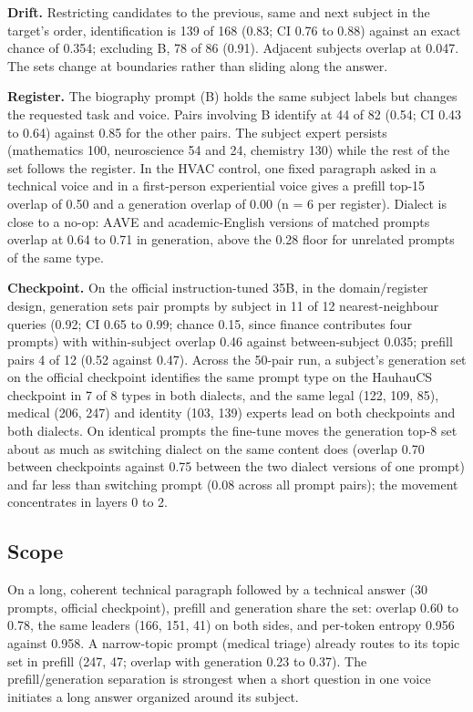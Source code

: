 \documentclass[10pt,twocolumn]{article}
\begin{document}
\textbf{Drift.} Restricting candidates to the previous, same and next subject in the target's order, identification is 139 of 168 (0.83; CI 0.76 to 0.88) against an exact chance of 0.354; excluding B, 78 of 86 (0.91). Adjacent subjects overlap at 0.047. The sets change at boundaries rather than sliding along the answer.

\textbf{Register.} The biography prompt (B) holds the same subject labels but changes the requested task and voice. Pairs involving B identify at 44 of 82 (0.54; CI 0.43 to 0.64) against 0.85 for the other pairs. The subject expert persists (mathematics 100, neuroscience 54 and 24, chemistry 130) while the rest of the set follows the register. In the HVAC control, one fixed paragraph asked in a technical voice and in a first-person experiential voice gives a prefill top-15 overlap of 0.50 and a generation overlap of 0.00 (n = 6 per register). Dialect is close to a no-op: AAVE and academic-English versions of matched prompts overlap at 0.64 to 0.71 in generation, above the 0.28 floor for unrelated prompts of the same type.

\textbf{Checkpoint.} On the official instruction-tuned 35B, in the domain/register design, generation sets pair prompts by subject in 11 of 12 nearest-neighbour queries (0.92; CI 0.65 to 0.99; chance 0.15, since finance contributes four prompts) with within-subject overlap 0.46 against between-subject 0.035; prefill pairs 4 of 12 (0.52 against 0.47). Across the 50-pair run, a subject's generation set on the official checkpoint identifies the same prompt type on the HauhauCS checkpoint in 7 of 8 types in both dialects, and the same legal (122, 109, 85), medical (206, 247) and identity (103, 139) experts lead on both checkpoints and both dialects. On identical prompts the fine-tune moves the generation top-8 set about as much as switching dialect on the same content does (overlap 0.70 between checkpoints against 0.75 between the two dialect versions of one prompt) and far less than switching prompt (0.08 across all prompt pairs); the movement concentrates in layers 0 to 2.

\subsection{Scope}

On a long, coherent technical paragraph followed by a technical answer (30 prompts, official checkpoint), prefill and generation share the set: overlap 0.60 to 0.78, the same leaders (166, 151, 41) on both sides, and per-token entropy 0.956 against 0.958. A narrow-topic prompt (medical triage) already routes to its topic set in prefill (247, 47; overlap with generation 0.23 to 0.37). The prefill/generation separation is strongest when a short question in one voice initiates a long answer organized around its subject.
\end{document}
